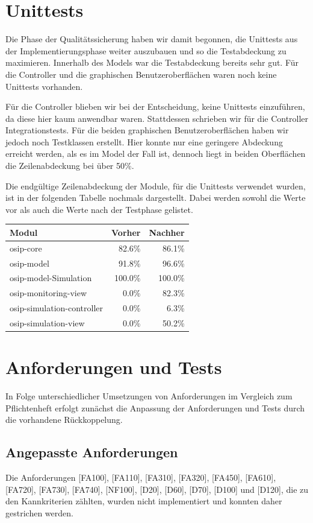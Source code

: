 \documentclass[parskip=full]{scrartcl}
\begin{document}
\section{Unittests}
Die Phase der Qualitätssicherung haben wir damit begonnen, die Unittests aus der Implementierungsphase weiter auszubauen und so die Testabdeckung zu maximieren.
Innerhalb des Models war die Testabdeckung bereits sehr gut. Für die Controller und die graphischen Benutzeroberflächen waren noch keine Unittests vorhanden.

Für die Controller blieben wir bei der Entscheidung, keine Unittests einzuführen, da diese hier kaum anwendbar waren. Stattdessen schrieben wir für die Controller
Integrationstests. Für die beiden graphischen Benutzeroberflächen haben wir jedoch noch Testklassen
erstellt. Hier konnte nur eine geringere Abdeckung erreicht werden, als es im Model der Fall ist, dennoch liegt in beiden Oberflächen die Zeilenabdeckung bei
über 50\%.

Die endgültige Zeilenabdeckung der Module, für die Unittests verwendet wurden, ist in der folgenden Tabelle nochmals dargestellt. Dabei werden sowohl die
Werte vor als auch die Werte nach der Testphase gelistet.

\begin{tabular} {| l || r | r |}
  \hline
  Modul				& Vorher	& Nachher	\\
  \hline \hline
  osip-core			& 82.6\%	& 86.1\%	\\
  osip-model			& 91.8\%	& 96.6\%	\\
  osip-model-Simulation		& 100.0\%	& 100.0\%	\\
  osip-monitoring-view		& 0.0\%		& 82.3\%	\\
  osip-simulation-controller	& 0.0\%		& 6.3\%		\\
  osip-simulation-view		& 0.0\%		& 50.2\%	\\
  \hline
\end{tabular}

\section{Anforderungen und Tests}
In Folge unterschiedlicher Umsetzungen von Anforderungen im Vergleich zum Pflichtenheft erfolgt zunächst die Anpassung der Anforderungen und Tests durch die vorhandene Rückkoppelung.

\subsection{Angepasste Anforderungen}
Die Anforderungen [FA100], [FA110], [FA310], [FA320], [FA450], [FA610], [FA720], [FA730], [FA740], [NF100], [D20], [D60], [D70], [D100] und [D120], die zu den Kannkriterien zählten, wurden nicht implementiert und konnten daher gestrichen werden.
\end{document}
